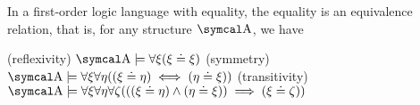 \begin{proposition}\label{thm:first_order_equality_is_equivalence_relation}
  In a first-order logic language with equality, the equality is an equivalence relation, that is, for any structure \( \CA \), we have
  \begin{description}
    (reflexivity) \( \CA \models \forall \xi (\xi \doteq \xi) \)
    (symmetry) \( \CA \models \forall \xi \forall \eta ((\xi \doteq \eta) \iff (\eta \doteq \xi)) \)
    (transitivity) \( \CA \models \forall \xi \forall \eta \forall \zeta (((\xi \doteq \eta) \land (\eta \doteq \xi)) \implies (\xi \doteq \zeta)) \)
  \end{description}
\end{proposition}

